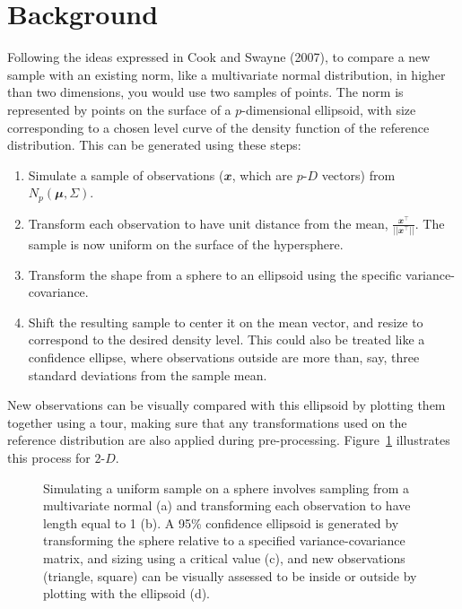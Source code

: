 \documentclass[
  12pt,
]{interact}
\providecommand{\tightlist}{%
  \setlength{\itemsep}{0pt}\setlength{\parskip}{0pt}}\usepackage{longtable,booktabs,array}
\def\tightlist{}
\newcommand\pD{$p\text{-}D$}
\newcommand\gD{$2\text{-}D$}
\begin{document}
\section{Background}\label{sec-background}

Following the ideas expressed in Cook and Swayne (2007), to compare a
new sample with an existing norm, like a multivariate normal
distribution, in higher than two dimensions, you would use two samples
of points. The norm is represented by points on the surface of a
\(p\)-dimensional ellipsoid, with size corresponding to a chosen level
curve of the density function of the reference distribution. This can be
generated using these steps:

\begin{enumerate}
\def\labelenumi{\arabic{enumi}.}
\tightlist
\item
  Simulate a sample of observations (\(\mathbfit{x}\), which are \pD{}
  vectors) from \(N_p(\mathbfit{\mu}, \Sigma)\).
\item
  Transform each observation to have unit distance from the mean,
  \(\frac{\mathbfit{x}^\top}{||\mathbfit{x}^\top||}\). The sample is now
  uniform on the surface of the hypersphere.
\item
  Transform the shape from a sphere to an ellipsoid using the specific
  variance-covariance.
\item
  Shift the resulting sample to center it on the mean vector, and resize
  to correspond to the desired density level. This could also be treated
  like a confidence ellipse, where observations outside are more than,
  say, three standard deviations from the sample mean.
\end{enumerate}

New observations can be visually compared with this ellipsoid by
plotting them together using a tour, making sure that any
transformations used on the reference distribution are also applied
during pre-processing. Figure~\ref{fig-ci} illustrates this process for
\gD.

\begin{figure}


\caption{\label{fig-ci}Simulating a uniform sample on a sphere involves
sampling from a multivariate normal (a) and transforming each
observation to have length equal to 1 (b). A 95\% confidence ellipsoid
is generated by transforming the sphere relative to a specified
variance-covariance matrix, and sizing using a critical value (c), and
new observations (triangle, square) can be visually assessed to be
inside or outside by plotting with the ellipsoid (d).}

\end{figure}%
\end{document}
